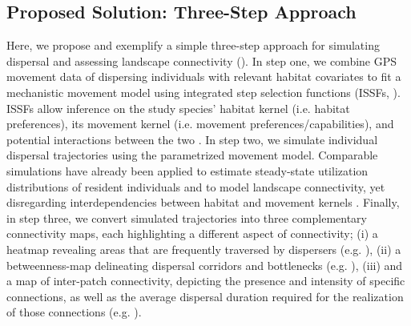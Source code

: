 \documentclass[abstract=on,10pt,a4paper,bibliography=totocnumbered]{article}
\begin{document}
\subsection{Proposed Solution: Three-Step Approach}
Here, we propose and exemplify a simple three-step approach for simulating
dispersal and assessing landscape connectivity (). In
step one, we combine GPS movement data of dispersing individuals with relevant
habitat covariates to fit a mechanistic movement model using integrated step
selection functions (ISSFs, \citealp{Avgar.2016}). ISSFs allow inference on the
study species' habitat kernel (i.e. habitat preferences), its movement kernel
(i.e. movement preferences/capabilities), and potential interactions between the
two \citep{Avgar.2016, Fieberg.2021}. In step two, we simulate individual
dispersal trajectories using the parametrized movement model. Comparable
simulations have already been applied to estimate steady-state utilization
distributions of resident individuals \citep{Potts.2013, Signer.2017} and to
model landscape connectivity, yet disregarding interdependencies between habitat
and movement kernels \citep{Clark.2015, Zeller.2020}. Finally, in step three, we
convert simulated trajectories into three complementary connectivity maps, each
highlighting a different aspect of connectivity; (i) a heatmap revealing areas
that are frequently traversed by dispersers (e.g. \citealp{Hauenstein.2019,
Zeller.2020}), (ii) a betweenness-map delineating dispersal corridors and
bottlenecks (e.g. \citealp{BastilleRousseau.2018}), (iii) and a map of
inter-patch connectivity, depicting the presence and intensity of specific
connections, as well as the average dispersal duration required for the
realization of those connections (e.g. \citealp{Gustafson.1996,
Kanagaraj.2013}).

\end{document}
